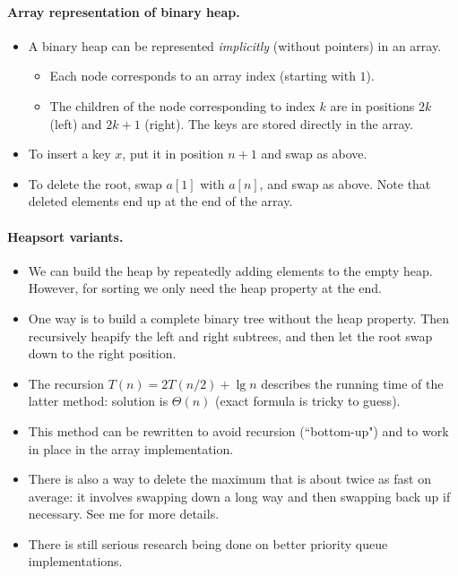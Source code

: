 \paragraph{Array representation of binary heap.}
\begin{itemize}
\item  A binary heap can be represented \emph{implicitly} (without pointers) in 
an array. 
\begin{itemize}
\item Each node corresponds to an array index (starting with $1$). 
\item The  children of the node corresponding to index $k$ are in positions $2k$ 
(left) and $2k+1$ (right). The keys are stored directly in the array.
\end{itemize}
\item To insert a key $x$, put it in position $n+1$ and swap as above.
\item To delete the root, swap $a[1]$ with $a[n]$, and swap as above. Note that
 deleted elements end up at the end of the array.
\end{itemize}

\paragraph{Heapsort variants.}
\begin{itemize}
\item We can build the heap by repeatedly adding elements to the empty heap.
However, for sorting we only need the heap property at the end.
\item One way is to build a complete binary tree without the heap property. Then
 recursively heapify the left and right subtrees, and then let the root swap 
 down to the right position. 
\item The recursion $T(n) = 2T(n/2) + \lg n$ describes the running time of the 
 latter method: solution is $\Theta(n)$ (exact formula is tricky to guess).
\item This method can be rewritten to avoid recursion (``bottom-up") and to work 
in place in the array implementation. 
\item There is also a way to delete the maximum that is about twice as fast on 
average: it involves swapping down a long way and then swapping back up if 
necessary. See me for more details.
\item There is still serious research being done on better priority queue 
implementations.
\end{itemize}

